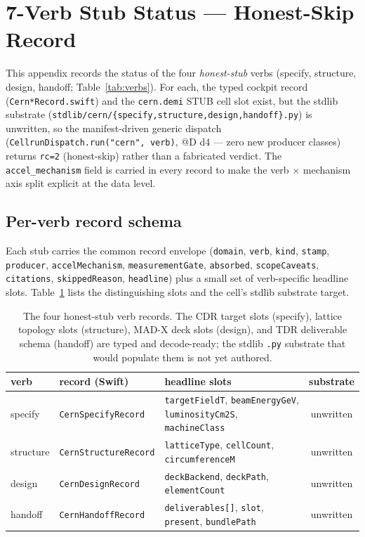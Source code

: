 \section{7-Verb Stub Status --- Honest-Skip Record}
\label{app:stubs}

This appendix records the status of the four \emph{honest-stub} verbs
(specify, structure, design, handoff; Table~\ref{tab:verbs}). For each,
the typed cockpit record (\verb|Cern*Record.swift|) and the
\verb|cern.demi| STUB cell slot exist, but the stdlib substrate
(\verb|stdlib/cern/{specify,structure,design,handoff}.py|) is unwritten,
so the manifest-driven generic dispatch
(\verb|CellrunDispatch.run("cern", verb)|, @D d4 --- zero new producer
classes) returns \texttt{rc=2} (honest-skip) rather than a fabricated
verdict. The \verb|accel_mechanism| field is carried in every record to
make the verb $\times$ mechanism axis split explicit at the data level.

\subsection{Per-verb record schema}
\label{app:stubs-schema}

Each stub carries the common record envelope (\verb|domain|, \verb|verb|,
\verb|kind|, \verb|stamp|, \verb|producer|, \verb|accelMechanism|,
\verb|measurementGate|, \verb|absorbed|, \verb|scopeCaveats|,
\verb|citations|, \verb|skippedReason|, \verb|headline|) plus a small set
of verb-specific headline slots. Table~\ref{tab:app-stubs} lists the
distinguishing slots and the cell's stdlib substrate target.

\begin{table}[h]
\centering
\small
\setlength{\tabcolsep}{5pt}
\begin{tabular}{@{}>{\raggedright\arraybackslash}m{1.6cm} >{\raggedright\arraybackslash}m{4.3cm} >{\raggedright\arraybackslash}m{4.3cm} c@{}}
\toprule
verb & record (Swift) & headline slots & substrate \\
\midrule
specify   & \texttt{CernSpecifyRecord}   & \texttt{targetFieldT}, \texttt{beamEnergyGeV}, \texttt{luminosityCm2S}, \texttt{machineClass} & unwritten \\
structure & \texttt{CernStructureRecord} & \texttt{latticeType}, \texttt{cellCount}, \texttt{circumferenceM} & unwritten \\
design    & \texttt{CernDesignRecord}    & \texttt{deckBackend}, \texttt{deckPath}, \texttt{elementCount} & unwritten \\
handoff   & \texttt{CernHandoffRecord}   & \texttt{deliverables[]}, \texttt{slot}, \texttt{present}, \texttt{bundlePath} & unwritten \\
\bottomrule
\end{tabular}
\caption{The four honest-stub verb records. The CDR target slots
(specify), lattice topology slots (structure), MAD-X deck slots (design),
and TDR deliverable schema (handoff) are typed and decode-ready; the
stdlib \texttt{.py} substrate that would populate them is not yet
authored.}
\label{tab:app-stubs}
\end{table}

